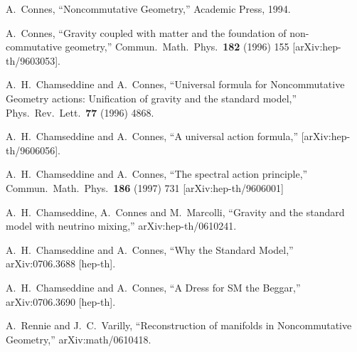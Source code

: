 \documentclass[12pt]{article}
\begin{document}
\begin{thebibliography}{99}




A.~Connes,
``Noncommutative Geometry,'' Academic Press, 1994.






A.~Connes,
``Gravity coupled with matter and the foundation of non-commutative
geometry,''
Commun.\ Math.\ Phys.\  {\bf 182} (1996) 155
[arXiv:hep-th/9603053].




A.~H.~Chamseddine and A.~Connes,
``Universal formula for Noncommutative Geometry actions: Unification of
gravity and the standard model,''
Phys.\ Rev.\ Lett.\  {\bf 77} (1996) 4868.
 
A.~H.~Chamseddine and A.~Connes,
``A universal action formula,''
[arXiv:hep-th/9606056].

A.~H.~Chamseddine and A.~Connes,
``The spectral action principle,''
Commun.\ Math.\ Phys.\ {\bf 186} (1997) 731
[arXiv:hep-th/9606001]

  A.~H.~Chamseddine, A.~Connes and M.~Marcolli,
  ``Gravity and the standard model with neutrino mixing,''
  arXiv:hep-th/0610241.

  A.~H.~Chamseddine and A.~Connes,
  ``Why the Standard Model,''
  arXiv:0706.3688 [hep-th].

  A.~H.~Chamseddine and A.~Connes,
  ``A Dress for SM the Beggar,''
  arXiv:0706.3690 [hep-th].


  A.~Rennie and J.~C.~Varilly,
  ``Reconstruction of manifolds in Noncommutative Geometry,''
  arXiv:math/0610418.



\end{thebibliography}
\end{document}

